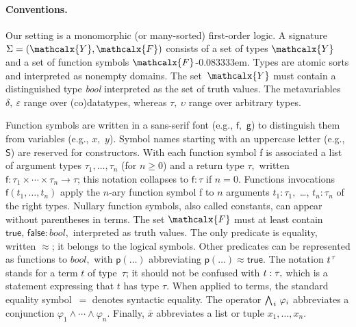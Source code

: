 \documentclass[smallcondensed,draft]{svjour3}
\newcommand\typ[1]{^{\vthinspace #1}}
\newcommand\Sig{\mathrm{\Sigma}}
\newcommand\const[1]{\textsf{#1}}
\newcommand\ty[1]{\textit{#1}}
\newcommand{\teq}{\approx}
\newcommand\Types{\mathcalx{Y}}
\newcommand\Funcs{\mathcalx{F}}
\newcommand\vthinspace{\kern+0.083333em}
\newcommand\negvthinspace{\kern-0.083333em}
\begin{document}
\paragraph{Conventions.}
Our setting is a monomorphic (or many-sorted) first-order logic.
A signature $\Sig = (\Types, \Funcs)$ consists of a set of types $\Types$ and a
set of function symbols $\Funcs$\negvthinspace. Types are atomic sorts and interpreted as
nonempty domains. The set~$\Types$ must contain a
distinguished type \ty{bool} interpreted as the set of truth
values. %
The metavariables $\delta,\:\varepsilon$ range over (co)datatypes,
whereas $\tau,\:\upsilon$ range over arbitrary types.

Function symbols are written in a sans-serif font (e.g., $\const{f},$ $\const{g}$) to
distinguish them from variables (e.g., $x,$ $y$).
Symbol names starting with an uppercase letter (e.g.,
$\const{S}$) are reserved for constructors. With each function symbol \const{f}
is associated a list of argument types $\tau_1,\ldots,\tau_n$ (for $n \ge 0$)
and a return type $\tau,$ written
$\const{f} : \tau_1 \times \cdots \times \tau_n \to \tau$;
this notation collapses to $\const{f} : \tau$ if $n = 0.$
%
Functions invocations $\const{f}(t_1,\ldots,t_n)$
apply the $n$-ary function symbol
\const{f} to $n$ %
arguments $t_1 \mathbin{:} \tau_1,$ \ldots, $t_n \mathbin{:}
\tau_n$ of the right types.
Nullary function symbols, also called constants, can appear without
parentheses in terms.
The set $\Funcs$ must at least contain
$\const{true},\, \const{false} : \ty{bool},$ interpreted as truth values.
The only predicate is equality, written $\teq$;
it belongs to the logical symbols.
Other predicates can be represented as functions to $\ty{bool},$
with $\const{p}(\ldots)$ abbreviating $\const{p}(\ldots) \teq \const{true}.$
The notation $t\typ{\tau}$ stands for a term $t$ of type~$\tau$;
it should not be confused with $t :\nobreak \tau,$
which is a statement expressing that $t$ has type $\tau.$
When applied to terms, the standard equality symbol~$=$ denotes syntactic equality.
The operator $\bigwedge_{\vthinspace i}\, \varphi_i$ abbreviates a conjunction
$\varphi_1 \mathrel\land \cdots \mathrel\land \varphi_n.$
Finally, $\bar x$ abbreviates a list or tuple $x_1,\ldots,x_n.$

\end{document}
